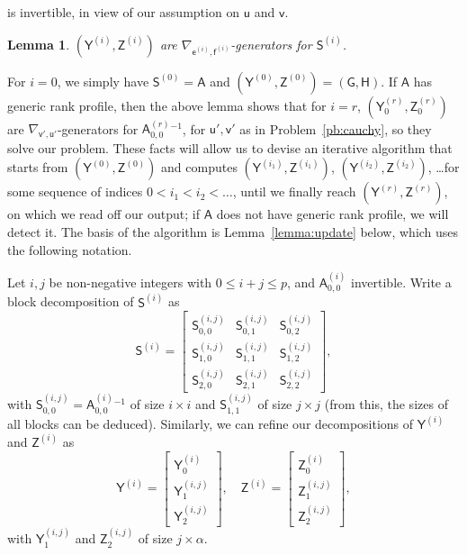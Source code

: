 \documentclass{sig-alternate}
\newcommand{\ve}{\ensuremath{\mathsf{e}}}
\newcommand{\vf}{\ensuremath{\mathsf{f}}}
\newcommand{\vu}{\ensuremath{\mathsf{u}}}
\newcommand{\vv}{\ensuremath{\mathsf{v}}}
\newcommand{\mA}{\ensuremath{\mathsf{A}}}
\newcommand{\mG}{\ensuremath{\mathsf{G}}}
\newcommand{\mH}{\ensuremath{\mathsf{H}}}
\newcommand{\mS}{\ensuremath{\mathsf{S}}}
\newcommand{\mY}{\ensuremath{\mathsf{Y}}}
\newcommand{\mZ}{\ensuremath{\mathsf{Z}}}
\newtheorem{lemma}[definition]{Lemma}
\begin{document}
is invertible, in view of our assumption on $\vu$ and $\vv$.
\begin{lemma}\label{lemma:cpj-cm}
 $(\mY^{(i)},\mZ^{(i)})$ are $\nabla_{\ve^{(i)},\vf^{(i)}}$-generators for $\mS^{(i)}$.
\end{lemma}
For $i=0$, we simply have $\mS^{(0)}=\mA$ and
$(\mY^{(0)},\mZ^{(0)})=(\mG,\mH)$.  If $\mA$ has generic rank profile,
then the above lemma shows that for $i=r$, $(\mY^{(r)}_0,\mZ^{(r)}_0)$
are $\nabla_{\vv',\vu'}$-generators for ${\mA^{(r)}_{0,0}}{}^{-1}$,
for $\vu',\vv'$ as in Problem~\ref{pb:cauchy}, so they solve our
problem.  These facts will allow us to devise an iterative algorithm
that starts from $(\mY^{(0)},\mZ^{(0)})$ and computes
$(\mY^{(i_1)},\mZ^{(i_1)})$, $(\mY^{(i_2)},\mZ^{(i_2)})$, \dots for
some sequence of indices $0 < i_1 < i_2 < \dots$, until we finally
reach $(\mY^{(r)},\mZ^{(r)})$, on which we read off our output; if
$\mA$ does not have generic rank profile, we will detect it. The basis
of the algorithm is Lemma~\ref{lemma:update} below, which uses the
following notation.

Let $i,j$ be non-negative integers with $0
\le i+j \le p$, and ${\mA^{(i)}_{0,0}}$ invertible. Write a block decomposition of $\mS^{(i)}$
as
\begin{equation}\label{eq:Siblock}
\mS^{(i)} = \left [ \begin{matrix} 
\mS^{(i,j)}_{0,0} & \mS^{(i,j)}_{0,1} & \mS^{(i,j)}_{0,2}\\
\mS^{(i,j)}_{1,0} & \mS^{(i,j)}_{1,1} & \mS^{(i,j)}_{1,2}\\
\mS^{(i,j)}_{2,0} & \mS^{(i,j)}_{2,1} & \mS^{(i,j)}_{2,2}
    \end{matrix}\right ],  
\end{equation}
with $\mS^{(i,j)}_{0,0}={\mA^{(i)}_{0,0}}{}^{-1}$ of size $i \times i$ and $\mS^{(i,j)}_{1,1}$
of size $j \times j$ (from this, the sizes of all blocks can
be deduced).  Similarly, we can refine our decompositions of $\mY^{(i)}$ and $\mZ^{(i)}$ as
$$\mY^{(i)}
 = \left [\begin{matrix}
\mY^{(i)}_0 \\\mY^{(i,j)}_1 \\\mY^{(i,j)}_2
   \end{matrix}\right ], \quad
\mZ^{(i)}
 = \left [\begin{matrix}
\mZ^{(i)}_0 \\\mZ^{(i,j)}_1 \\\mZ^{(i,j)}_2
   \end{matrix}\right ],$$
with $\mY^{(i,j)}_1$ and $\mZ^{(i,j)}_2$ of size $j \times \alpha$.
\end{document}
